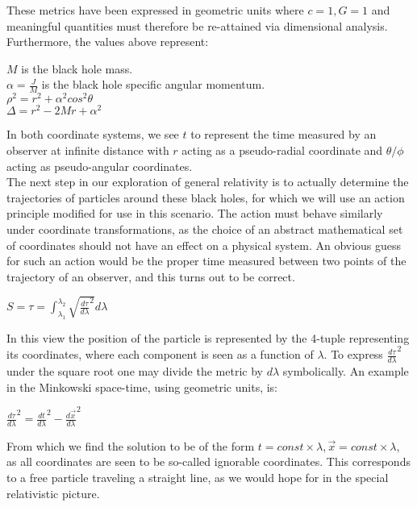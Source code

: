 \documentclass[]{article}
\begin{document}
These metrics have been expressed in geometric units where $c = 1, G = 1$ and meaningful quantities must therefore be re-attained via dimensional analysis. Furthermore, the values above represent:

\begin{center}
	$M$ is the black hole mass. \\
	$\alpha = \frac{J}{M}$ is the black hole specific angular momentum. \\
	$\rho^2 = r^2 + \alpha^2 cos^2 \theta$ \\
	$\Delta = r^2 - 2Mr + \alpha^2$
\end{center}

In both coordinate systems, we see $t$ to represent the time measured by an observer at infinite distance with $r$ acting as a pseudo-radial coordinate and $\theta/\phi$ acting as pseudo-angular coordinates. \\

The next step in our exploration of general relativity is to actually determine the trajectories of particles around these black holes, for which we will use an action principle modified for use in this scenario. The action must behave similarly under coordinate transformations, as the choice of an abstract mathematical set of coordinates should not have an effect on a physical system. An obvious guess for such an action would be the proper time measured between two points of the trajectory of an observer, and this turns out to be correct.

\begin{center}
	$S = \tau = \int_{\lambda_1}^{\lambda_2} 
		\sqrt{\frac{d\tau}{d\lambda}^2 } d\lambda$
\end{center}

In this view the position of the particle is represented by the 4-tuple representing its coordinates, where each component is seen as a function of $\lambda$. To express $\frac{d\tau}{d\lambda}^2$ under the square root one may divide the metric by $d\lambda$ symbolically. An example in the Minkowski space-time, using geometric units, is:
	
\begin{center}
	$\frac{d\tau}{d\lambda}^2 = \frac{dt}{d\lambda}^2 - \frac{d\vec{x}}{d\lambda}^2$
\end{center}

From which we find the solution to be of the form $t = const \times \lambda , \vec{x} = const \times \lambda$, as all coordinates are seen to be so-called ignorable coordinates. This corresponds to a free particle traveling a straight line, as we would hope for in the special relativistic picture. \\
\end{document}
